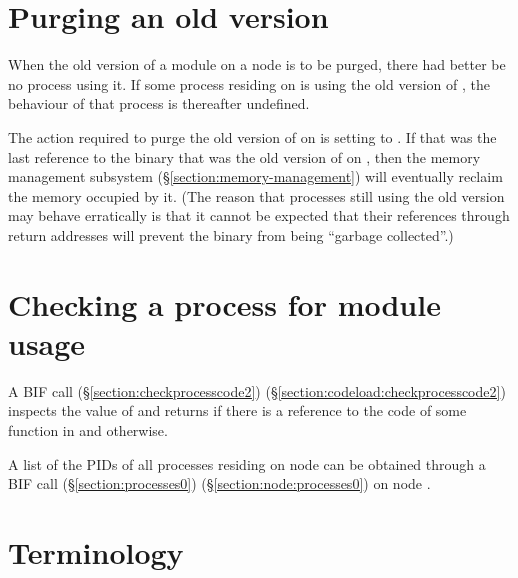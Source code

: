 \section{Purging an old version}

\label{section:purging-old-version}

When the old version of a module  on a node  is to be
purged, there had better be no process using it.  If some process
residing on  is using the old version of , the behaviour
of that process is thereafter undefined.

The action required to purge the old version of  on  is
setting\linebreak[2]  to
.  If that was the last reference to the binary that was the
old version of  on , then the memory management
subsystem (\S\ref{section:memory-management}) will eventually reclaim
the memory occupied by it.  (The reason that processes still using the
old version may behave erratically is that it cannot be expected that
their references through return addresses will prevent the binary from
being ``garbage collected''.)

\section{Checking a process for module usage}

\label{section:checking-process-module}

A BIF call
\ifOld {}
(\S\ref{section:checkprocesscode2}) \fi
\ifStd {}
(\S\ref{section:codeload:checkprocesscode2}) \fi
inspects the value of  and returns  if there is
a reference to the code of some function in
 and  otherwise.

A list of the PIDs of all processes residing on node  can be obtained
through a BIF call
\ifOld {} (\S\ref{section:processes0}) \fi
\ifStd {} (\S\ref{section:node:processes0}) \fi
on node .




\iffalse
\section{Terminology}

